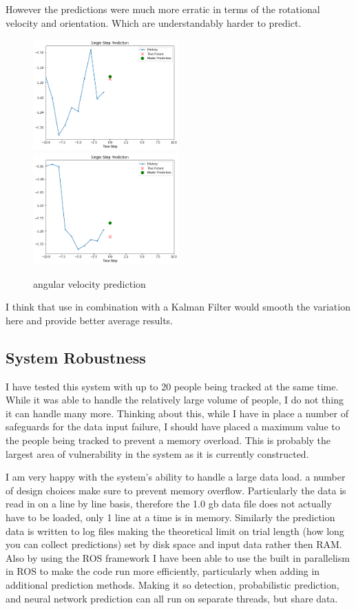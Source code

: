 \documentclass[10pt,a4paper]{article}
\begin{document}
However the predictions were much more erratic in terms of the rotational velocity and orientation. Which are understandably harder to predict. 
\begin{figure}[H]
\caption{angular velocity prediction} 
\includegraphics[width=0.5\textwidth]{../graphs/th_val_one.png}
\includegraphics[width=0.5\textwidth]{../graphs/th_val_two.png}
\end{figure}
I think that use in combination with a Kalman Filter would smooth the variation here and provide better average results.

\subsection{System Robustness}
I have tested this system with up to 20 people being tracked at the same time. While it was able to handle the relatively large volume of people, I do not thing it can handle many more. Thinking about this, while I have in place a number of safeguards for the data input failure, I should have placed a maximum value to the people being tracked to prevent a memory overload. This is probably the largest area of vulnerability in the system as it is currently constructed. 

I am very happy with the system's ability to handle a large data load. a number of design choices make sure to prevent memory overflow. Particularly the data is read in on a line by line basis, therefore the 1.0 gb data file does not actually have to be loaded, only 1 line at a time is in memory. Similarly the prediction data is written to log files making the theoretical limit on trial length (how long you can collect predictions) set by disk space and input data rather then RAM. Also by using the ROS framework I have been able to use the built in parallelism in ROS to make the code run more efficiently, particularly when adding in additional prediction methods. Making it so detection, probabilistic prediction, and neural network prediction can all run on separate threads, but share data.
\end{document}
